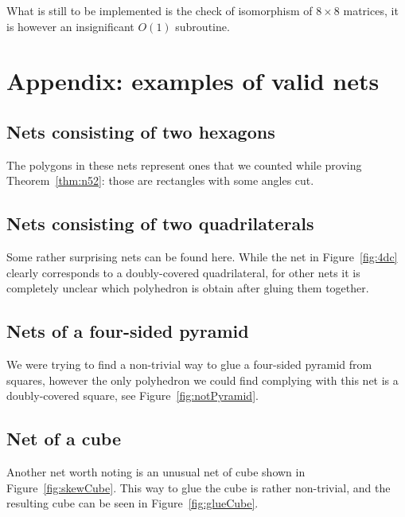 \documentclass[a4paper,11pt]{article}
\begin{document}
What is still to be implemented is the check of isomorphism of $8 \times 8$ matrices, it is however an insignificant $O(1)$ subroutine.

\section*{Appendix: examples of valid nets}

\subsection*{Nets consisting of two hexagons}

The polygons in these nets represent ones that we counted while proving Theorem~\ref{thm:n52}: those are rectangles with some angles cut.



\subsection*{Nets consisting of two quadrilaterals}

Some rather surprising nets can be found here. While the net in Figure~\ref{fig:4dc} clearly corresponds to a doubly-covered quadrilateral, for other nets it is completely unclear which polyhedron is obtain after gluing them together.



\subsection*{Nets of a four-sided pyramid}

We were trying to find a non-trivial way to glue a four-sided pyramid from squares, however the only polyhedron we could find complying with this net is a doubly-covered square, see Figure~\ref{fig:notPyramid}.



\subsection*{Net of a cube}

Another net worth noting is an unusual net of cube shown in Figure~\ref{fig:skewCube}. This way to glue the cube is rather non-trivial, and the resulting cube can be seen in Figure~\ref{fig:glueCube}.



{}

\end{document}
